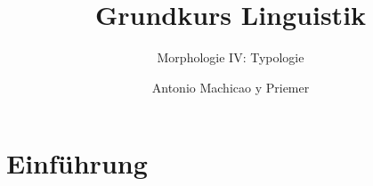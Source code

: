 
\title{Grundkurs Linguistik}

\subtitle{Morphologie IV: Typologie}

\author[aMyP]{
	{\small Antonio Machicao y Priemer}
}


\date{ }





\huberlintitlepage






\section{Einführung}


